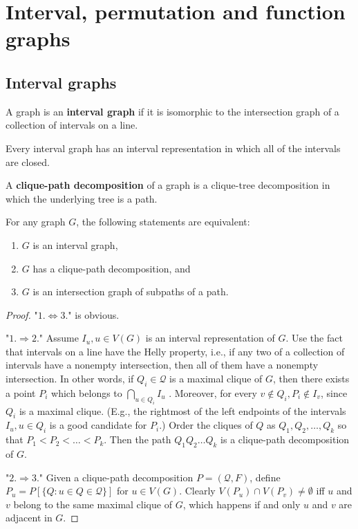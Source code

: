 \chapter{Interval, permutation and function graphs}

\section{Interval graphs}

\begin{defn}
	A graph is an \textbf{interval graph} if it is isomorphic to the intersection graph of a collection of intervals on a line.
\end{defn}

\begin{observ}
	Every interval graph has an interval representation in which all of the intervals are closed.
\end{observ}

\begin{defn}
	A \textbf{clique-path decomposition} of a graph is a clique-tree decomposition in which the underlying tree is a path.
\end{defn}

\begin{thm}
	For any graph $G$, the following statements are equivalent:
	
	\begin{enumerate}
		\item $G$ is an interval graph,
		\item $G$ has a clique-path decomposition, and
		\item $G$ is an intersection graph of subpaths of a path.
	\end{enumerate}
\end{thm}

\begin{proof}
	"$1. \Leftrightarrow 3.$" is obvious.
	
	"$1. \Rightarrow 2.$" Assume $I_u , u \in V(G)$ is an interval representation of $G$. Use the fact that intervals on a line have the Helly property, i.e., if any two of a collection of intervals have a nonempty intersection, then all of them have a nonempty intersection. In other words, if $Q_i \in \mathcal{Q}$ is a maximal clique of $G$, then there exists a point $P_i$ which belongs to $\bigcap_{u \in Q_i} I_u$ . Moreover, for every $v \notin Q_i , P_i \notin I_v$, since $Q_i$ is a maximal clique. (E.g., the rightmost of the left endpoints of the intervals $I_u , u \in Q_i$ is a good candidate for $P_i$.) Order the cliques of $Q$ as $Q_1, Q_2, \dots, Q_k$ so that $P_1 < P_2 < \dots < P_k$. Then the path
	$Q_1 Q_2 \dots Q_k$ is a clique-path decomposition of $G$.
	
	"$2. \Rightarrow 3.$" Given a clique-path decomposition $P = (\mathcal{Q}, F)$, define $P_u = P [\{Q : u \in Q \in \mathcal{Q}\}]$ for $u \in V(G)$. Clearly $V(P_u) \cap V(P_v) \neq \emptyset$ iff $u$ and $v$ belong to the same maximal clique of $G$, which happens if and only $u$ and $v$ are adjacent in $G$.
\end{proof}

